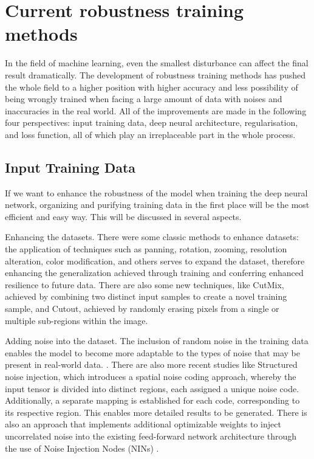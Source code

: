 \documentclass{article}
\begin{document}
\section{Current robustness training methods}

In the field of machine learning, even the smallest disturbance can affect the final result dramatically. The development of robustness training methods has pushed the whole field to a higher position with higher accuracy and less possibility of being wrongly trained when facing a large amount of data with noises and inaccuracies in the real world. All of the improvements are made in the following four perspectives: input training data, deep neural architecture, regularisation, and loss function, all of which play an irreplaceable part in the whole process.

\subsection{Input Training Data}

If we want to enhance the robustness of the model when training the deep neural network, organizing and purifying training data in the first place will be the most efficient and easy way. This will be discussed in several aspects.

Enhancing the datasets. There were some classic methods to enhance datasets: the application of techniques such as panning, rotation, zooming, resolution alteration, color modification, and others serves to expand the dataset, therefore enhancing the generalization achieved through training and conferring enhanced resilience to future data. There are also some new techniques, like CutMix\cite{yun2019cutmixregularizationstrategytrain}, achieved by combining two distinct input samples to create a novel training sample, and Cutout\cite{devries2017improvedregularizationconvolutionalneural}, achieved by randomly erasing pixels from a single or multiple sub-regions within the image.

Adding noise into the dataset. The inclusion of random noise in the training data enables the model to become more adaptable to the types of noise that may be present in real-world data\cite{6889193}. \cite{rakin2018parametricnoiseinjectiontrainable}. There are also more recent studies like Structured noise injection\cite{alharbi2020disentangledimagegenerationstructured}, which introduces a spatial noise coding approach, whereby the input tensor is divided into distinct regions, each assigned a unique noise code. Additionally, a separate mapping is established for each code, corresponding to its respective region. This enables more detailed results to be generated. There is also an approach that implements additional optimizable weights to inject uncorrelated noise into the existing feed-forward network architecture through the use of Noise Injection Nodes (NINs) \cite{levi2022noiseinjectionprobedeep}. 
\end{document}
